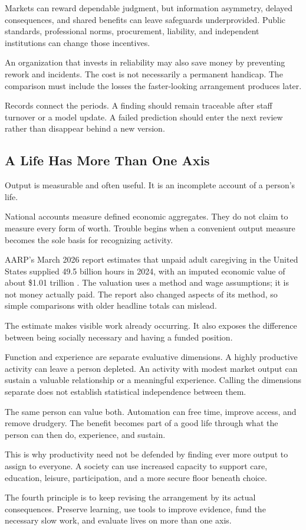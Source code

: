 Markets can reward dependable judgment, but information asymmetry, delayed consequences, and shared benefits can leave safeguards underprovided. Public standards, professional norms, procurement, liability, and independent institutions can change those incentives.

An organization that invests in reliability may also save money by preventing rework and incidents. The cost is not necessarily a permanent handicap. The comparison must include the losses the faster-looking arrangement produces later.

Records connect the periods. A finding should remain traceable after staff turnover or a model update. A failed prediction should enter the next review rather than disappear behind a new version.

\subsection{A Life Has More Than One Axis}

Output is measurable and often useful. It is an incomplete account of a person's life.

National accounts measure defined economic aggregates. They do not claim to measure every form of worth. Trouble begins when a convenient output measure becomes the sole basis for recognizing activity.

AARP's March 2026 report estimates that unpaid adult caregiving in the United States supplied 49.5 billion hours in 2024, with an imputed economic value of about \$1.01 trillion \cite{aarp2026valuing}. The valuation uses a method and wage assumptions; it is not money actually paid. The report also changed aspects of its method, so simple comparisons with older headline totals can mislead.

The estimate makes visible work already occurring. It also exposes the difference between being socially necessary and having a funded position.

Function and experience are separate evaluative dimensions. A highly productive activity can leave a person depleted. An activity with modest market output can sustain a valuable relationship or a meaningful experience. Calling the dimensions separate does not establish statistical independence between them.

The same person can value both. Automation can free time, improve access, and remove drudgery. The benefit becomes part of a good life through what the person can then do, experience, and sustain.

This is why productivity need not be defended by finding ever more output to assign to everyone. A society can use increased capacity to support care, education, leisure, participation, and a more secure floor beneath choice.

The fourth principle is to keep revising the arrangement by its actual consequences. Preserve learning, use tools to improve evidence, fund the necessary slow work, and evaluate lives on more than one axis.
